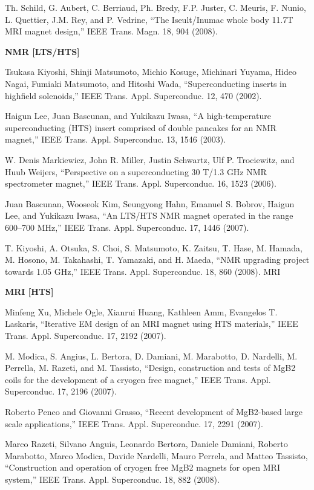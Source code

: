 \noindent [9.375] Th. Schild, G. Aubert, C. Berriaud, Ph. Bredy, F.P. Juster, C. Meuris, F. Nunio,
L. Quettier, J.M. Rey, and P. Vedrine, ``The Iseult/Inumac whole body 11.7T
MRI magnet design,” IEEE Trans. Magn. 18, 904 (2008).

\noindent \textbf{NMR [LTS/HTS]}

\noindent [9.376] Tsukasa Kiyoshi, Shinji Matsumoto, Michio Kosuge, Michinari Yuyama, Hideo
Nagai, Fumiaki Matsumoto, and Hitoshi Wada, ``Superconducting inserts in highfield
solenoids,” IEEE Trans. Appl. Superconduc. 12, 470 (2002).

\noindent [9.377] Haigun Lee, Juan Bascunan, and Yukikazu Iwasa, ``A high-temperature superconducting
(HTS) insert comprised of double pancakes for an NMR magnet,” IEEE
Trans. Appl. Superconduc. 13, 1546 (2003).

\noindent [9.378] W. Denis Markiewicz, John R. Miller, Justin Schwartz, Ulf P. Trociewitz, and
Huub Weijers, ``Perspective on a superconducting 30 T/1.3 GHz NMR spectrometer
magnet,” IEEE Trans. Appl. Superconduc. 16, 1523 (2006).

\noindent [9.379] Juan Bascunan, Wooseok Kim, Seungyong Hahn, Emanuel S. Bobrov, Haigun
Lee, and Yukikazu Iwasa, ``An LTS/HTS NMR magnet operated in the range
600–700 MHz,” IEEE Trans. Appl. Superconduc. 17, 1446 (2007).

\noindent [9.380] T. Kiyoshi, A. Otsuka, S. Choi, S. Matsumoto, K. Zaitsu, T. Hase, M. Hamada,
M. Hosono, M. Takahashi, T. Yamazaki, and H. Maeda, ``NMR upgrading project
towards 1.05 GHz,” IEEE Trans. Appl. Superconduc. 18, 860 (2008).
MRI 

\noindent \textbf{MRI [HTS]}

\noindent [9.381] Minfeng Xu, Michele Ogle, Xianrui Huang, Kathleen Amm, Evangelos T. Laskaris,
``Iterative EM design of an MRI magnet using HTS materials,” IEEE Trans. Appl.
Superconduc. 17, 2192 (2007).

\noindent [9.382] M. Modica, S. Angius, L. Bertora, D. Damiani, M. Marabotto, D. Nardelli,
M. Perrella, M. Razeti, and M. Tassisto, ``Design, construction and tests of MgB2
coils for the development of a cryogen free magnet,” IEEE Trans. Appl. Superconduc.
17, 2196 (2007).

\noindent [9.383] Roberto Penco and Giovanni Grasso, ``Recent development of MgB2-based large
scale applications,” IEEE Trans. Appl. Superconduc. 17, 2291 (2007).

\noindent [9.384] Marco Razeti, Silvano Anguis, Leonardo Bertora, Daniele Damiani, Roberto
Marabotto, Marco Modica, Davide Nardelli, Mauro Perrela, and Matteo Tassisto,
``Construction and operation of cryogen free MgB2 magnets for open MRI
system,” IEEE Trans. Appl. Superconduc. 18, 882 (2008).

